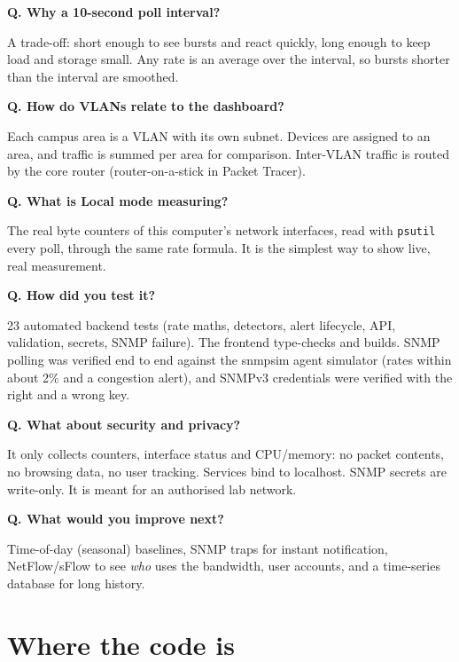 \documentclass[11pt,a4paper]{article}
\newcommand{\code}[1]{\texttt{#1}}
\newcommand{\qa}[2]{\par\textbf{\sffamily Q. #1}\par\vspace{-2pt}#2\par\vspace{4pt}}
\begin{document}
\qa{Why a 10-second poll interval?}{A trade-off: short enough to see bursts and react quickly, long enough to keep load and
storage small. Any rate is an average over the interval, so bursts shorter than the interval are smoothed.}

\qa{How do VLANs relate to the dashboard?}{Each campus area is a VLAN with its own subnet. Devices are assigned to an area, and
traffic is summed per area for comparison. Inter-VLAN traffic is routed by the core router (router-on-a-stick in Packet Tracer).}

\qa{What is Local mode measuring?}{The real byte counters of this computer's network interfaces, read with \code{psutil} every
poll, through the same rate formula. It is the simplest way to show live, real measurement.}

\qa{How did you test it?}{23 automated backend tests (rate maths, detectors, alert lifecycle, API, validation, secrets, SNMP
failure). The frontend type-checks and builds. SNMP polling was verified end to end against the snmpsim agent simulator (rates within about 2\% and a congestion alert), and SNMPv3 credentials were verified with the right and a wrong key.}

\qa{What about security and privacy?}{It only collects counters, interface status and CPU/memory: no packet contents, no
browsing data, no user tracking. Services bind to localhost. SNMP secrets are write-only. It is meant for an authorised lab
network.}

\qa{What would you improve next?}{Time-of-day (seasonal) baselines, SNMP traps for instant notification, NetFlow/sFlow to see
\emph{who} uses the bandwidth, user accounts, and a time-series database for long history.}

\section{Where the code is}
\end{document}
